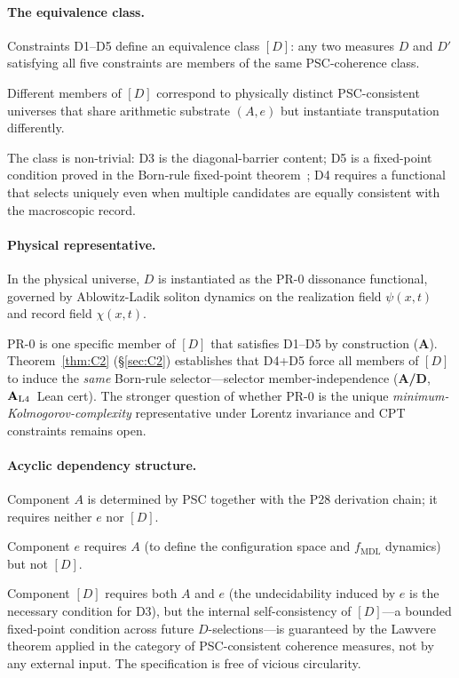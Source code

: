 \documentclass[12pt,letterpaper]{article}
\newcommand{\fmdl}{f_{\mathrm{MDL}}}
\newcommand{\Dclass}{[D]}
\newcommand{\catAL}{\ensuremath{\textbf{A}_{\rm L4}}}
\newcommand{\catA}{\textbf{A}}
\newcommand{\catAD}{\textbf{A/D}}
\begin{document}
\paragraph{The equivalence class.}
Constraints D1--D5 define an equivalence class $\Dclass$: any two measures $D$
and $D'$ satisfying all five constraints are members of the same PSC-coherence
class.

Different members of $\Dclass$ correspond to physically distinct PSC-consistent
universes that share arithmetic substrate $(A, e)$ but instantiate transputation
differently.

The class is non-trivial: D3 is the diagonal-barrier content; D5 is a fixed-point
condition proved in the Born-rule fixed-point theorem~\cite{SpivackBornRule}; D4 requires a functional that selects uniquely even
when multiple candidates are equally consistent with the macroscopic record.

\paragraph{Physical representative.}
In the physical universe, $D$ is instantiated as the PR-0 dissonance functional,
governed by Ablowitz-Ladik soliton dynamics on the realization field $\psi(x,t)$
and record field $\chi(x,t)$.

PR-0 is one specific member of $\Dclass$ that satisfies D1--D5 by construction
(\catA).  Theorem~\ref{thm:C2} (§\ref{sec:C2}) establishes that D4+D5 force all
members of $[D]$ to induce the \emph{same} Born-rule selector---selector
member-independence (\catAD, \catAL\ Lean cert).  The stronger question of whether
PR-0 is the unique \emph{minimum-Kolmogorov-complexity} representative under
Lorentz invariance and CPT constraints remains open.

\paragraph{Acyclic dependency structure.}
Component $A$ is determined by PSC together with the P28 derivation chain; it
requires neither $e$ nor $\Dclass$.

Component $e$ requires $A$ (to define the configuration space and $\fmdl$ dynamics)
but not $\Dclass$.

Component $\Dclass$ requires both $A$ and $e$ (the undecidability induced by $e$ is
the necessary condition for D3), but the internal self-consistency of $\Dclass$---a
bounded fixed-point condition across future $D$-selections---is guaranteed by the
Lawvere theorem applied in the category of PSC-consistent coherence measures, not by
any external input.  The specification is free of vicious circularity.
\end{document}
